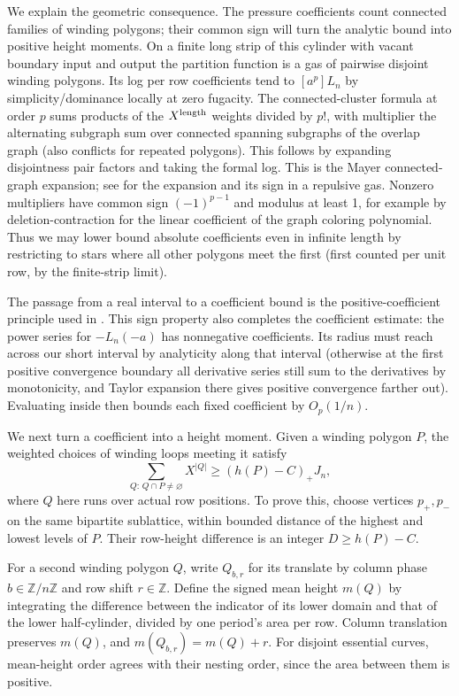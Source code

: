 \documentclass[11pt]{article}
\numberwithin{equation}{section}
\theoremstyle{definition}\newtheorem{definition}[theorem]{Definition}
\theoremstyle{remark}\newtheorem{remark}[theorem]{Remark}
\begin{document}
We explain the geometric consequence. The pressure coefficients count connected families of winding polygons; their common sign will turn the analytic bound into positive height moments. On a finite long strip of this cylinder with vacant boundary input and output the partition function is a gas of pairwise disjoint winding polygons. Its log per row coefficients tend to \([a^p]L_n\) by simplicity/dominance locally at zero fugacity. The connected-cluster formula at order \(p\) sums products of the \(X^{\rm length}\) weights divided by \(p!\), with multiplier the alternating subgraph sum over connected spanning subgraphs of the overlap graph (also conflicts for repeated polygons). This follows by expanding disjointness pair factors and taking the formal log. This is the Mayer connected-graph expansion; see \cite[Propositions~2.1, 2.6 and~2.8]{ScottSokal2005} for the expansion and its sign in a repulsive gas. Nonzero multipliers have common sign \((-1)^{p-1}\) and modulus at least 1, for example by deletion-contraction for the linear coefficient of the graph coloring polynomial. Thus we may lower bound absolute coefficients even in infinite length by restricting to stars where all other polygons meet the first (first counted per unit row, by the finite-strip limit).

The passage from a real interval to a coefficient bound is the positive-coefficient principle used in \cite[Section~2.3]{ScottSokal2005}. This sign property also completes the coefficient estimate: the power series for \(-L_n(-a)\) has nonnegative coefficients. Its radius must reach across our short interval by analyticity along that interval (otherwise at the first positive convergence boundary all derivative series still sum to the derivatives by monotonicity, and Taylor expansion there gives positive convergence farther out). Evaluating inside then bounds each fixed coefficient by \(O_p(1/n)\).

We next turn a coefficient into a height moment. Given a winding
polygon $P$, the weighted choices of winding loops meeting it satisfy
\begin{equation}\label{L:eq:winding-overlap}
 \sum_{Q:\,Q\cap P\ne\varnothing}X^{|Q|}
       \ge (h(P)-C)_+J_n,
\end{equation}
where $Q$ here runs over actual row positions. To prove this, choose
vertices $p_+,p_-$ on the same bipartite sublattice, within bounded
distance of the highest and lowest levels of $P$. Their row-height
difference is an integer $D\ge h(P)-C$.

For a second winding polygon $Q$, write $Q_{b,r}$ for its translate by
column phase $b\in\mathbb Z/n\mathbb Z$ and row shift $r\in\mathbb Z$.
Define the signed mean height $m(Q)$ by integrating the difference
between the indicator of its lower domain and that of the lower
half-cylinder, divided by one period's area per row. Column translation
preserves $m(Q)$, and $m(Q_{b,r})=m(Q)+r$. For disjoint essential curves,
mean-height order agrees with their nesting order, since the area
between them is positive.
\end{document}
